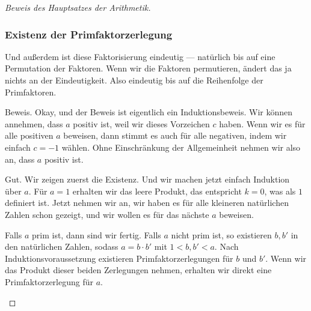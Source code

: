 \begin{math-stroke}
\end{math-stroke}

\begin{proof}[Beweis des Hauptsatzes der Arithmetik]
\subsubsection{Existenz der Primfaktorzerlegung}

\begin{spoken-clean}[00:47:29 - 00:48:34]
Und außerdem ist diese Faktorisierung eindeutig --- natürlich bis auf eine Permutation der Faktoren. Wenn wir die Faktoren permutieren, ändert das ja nichts an der Eindeutigkeit. Also eindeutig bis auf die Reihenfolge der Primfaktoren.
\end{spoken-clean}

\begin{spoken-clean}[00:48:34 - 00:51:54]
Beweis. Okay, und der Beweis ist eigentlich ein Induktionsbeweis. Wir können annehmen, dass $a$ positiv ist, weil wir dieses Vorzeichen $c$ haben. Wenn wir es für alle positiven $a$ beweisen, dann stimmt es auch für alle negativen, indem wir einfach $c = -1$ wählen. Ohne Einschränkung der Allgemeinheit nehmen wir also an, dass $a$ positiv ist.

Gut. Wir zeigen zuerst die Existenz. Und wir machen jetzt einfach Induktion über $a$. Für $a = 1$ erhalten wir das leere Produkt, das entspricht $k = 0$, was als $1$ definiert ist. Jetzt nehmen wir an, wir haben es für alle kleineren natürlichen Zahlen schon gezeigt, und wir wollen es für das nächste $a$ beweisen.

Falls $a$ prim ist, dann sind wir fertig. Falls $a$ nicht prim ist, so existieren $b, b'$ in den natürlichen Zahlen, sodass $a = b \cdot b'$ mit $1 < b, b' < a$. Nach Induktionsvoraussetzung existieren Primfaktorzerlegungen für $b$ und $b'$. Wenn wir das Produkt dieser beiden Zerlegungen nehmen, erhalten wir direkt eine Primfaktorzerlegung für $a$.
\end{spoken-clean}


\end{proof}
